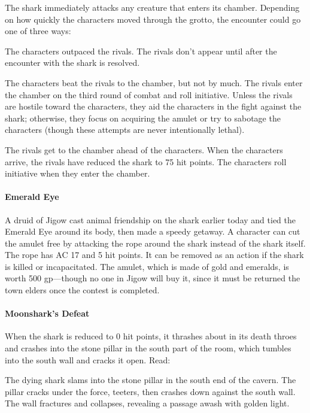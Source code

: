 \documentclass[10pt,a4paper,twoside,twocolumn,openany,nodeprecatedcode]{dndbook}
\begin{document}
The shark immediately attacks any creature that enters its chamber. Depending on how quickly the characters moved through the grotto, the encounter could go one of three ways:


\begin{description}[nolistsep]
\item[Fast Pace (10 or Fewer Rounds).]
The characters outpaced the rivals. The rivals don't appear until after the encounter with the shark is resolved.
\item[Moderate Pace (Between 11 and 15 Rounds).]
The characters beat the rivals to the chamber, but not by much. The rivals enter the chamber on the third round of combat and roll initiative. Unless the rivals are hostile toward the characters, they aid the characters in the fight against the shark; otherwise, they focus on acquiring the amulet or try to sabotage the characters (though these attempts are never intentionally lethal).
\item[Slow Pace (16 or More Rounds).]
The rivals get to the chamber ahead of the characters. When the characters arrive, the rivals have reduced the shark to 75 hit points. The characters roll initiative when they enter the chamber.
\end{description}

\paragraph{Emerald Eye}
A druid of Jigow cast animal friendship on the shark earlier today and tied the Emerald Eye around its body, then made a speedy getaway. A character can cut the amulet free by attacking the rope around the shark instead of the shark itself. The rope has AC 17 and 5 hit points. It can be removed as an action if the shark is killed or incapacitated. The amulet, which is made of gold and emeralds, is worth 500 gp—though no one in Jigow will buy it, since it must be returned the town elders once the contest is completed.

\paragraph{Moonshark's Defeat}
When the shark is reduced to 0 hit points, it thrashes about in its death throes and crashes into the stone pillar in the south part of the room, which tumbles into the south wall and cracks it open. Read:

\begin{DndReadAloud}{}
The dying shark slams into the stone pillar in the south end of the cavern. The pillar cracks under the force, teeters, then crashes down against the south wall. The wall fractures and collapses, revealing a passage awash with golden light.

\end{DndReadAloud}
\end{document}
